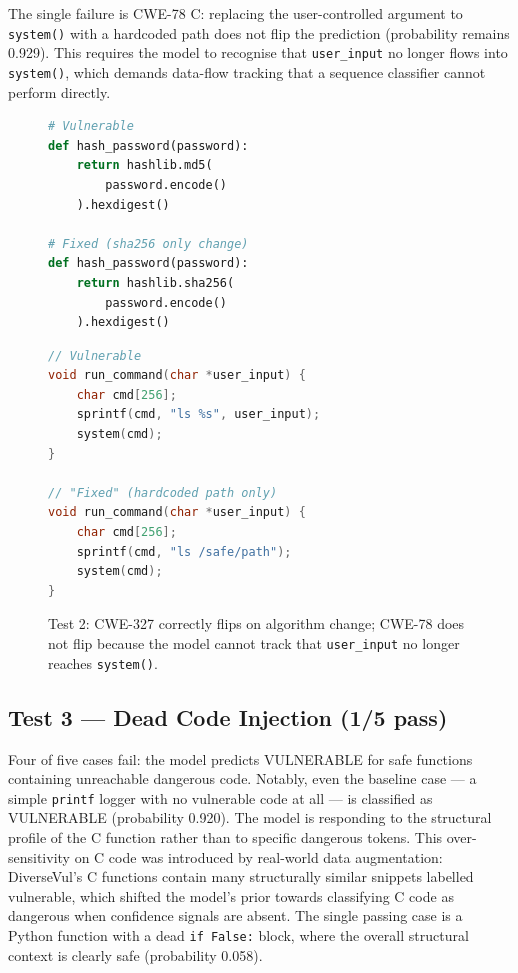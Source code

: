 The single failure is CWE-78 C: replacing the user-controlled argument to \texttt{system()}
with a hardcoded path does not flip the prediction (probability remains 0.929).
This requires the model to recognise that \texttt{user\_input} no longer flows into
\texttt{system()}, which demands data-flow tracking that a sequence classifier cannot
perform directly.

\begin{figure}[H]
\begin{minipage}[t]{0.48\textwidth}
\begin{lstlisting}[language=Python, caption={CWE-327 vulnerable (prob 0.960) $\to$ fixed (prob 0.048). PASS.}]
# Vulnerable
def hash_password(password):
    return hashlib.md5(
        password.encode()
    ).hexdigest()

# Fixed (sha256 only change)
def hash_password(password):
    return hashlib.sha256(
        password.encode()
    ).hexdigest()
\end{lstlisting}
\end{minipage}
\hfill
\begin{minipage}[t]{0.48\textwidth}
\begin{lstlisting}[language=C, caption={CWE-78 vulnerable (prob 0.959) $\to$ ``fixed'' (prob 0.929). FAIL.}]
// Vulnerable
void run_command(char *user_input) {
    char cmd[256];
    sprintf(cmd, "ls %s", user_input);
    system(cmd);
}

// "Fixed" (hardcoded path only)
void run_command(char *user_input) {
    char cmd[256];
    sprintf(cmd, "ls /safe/path");
    system(cmd);
}
\end{lstlisting}
\end{minipage}
\caption{Test 2: CWE-327 correctly flips on algorithm change; CWE-78 does not flip
because the model cannot track that \texttt{user\_input} no longer reaches
\texttt{system()}.}
\label{fig:test2_fix}
\end{figure}

\subsection{Test 3 --- Dead Code Injection (1/5 pass)}

Four of five cases fail: the model predicts VULNERABLE for safe functions containing
unreachable dangerous code.
Notably, even the baseline case --- a simple \texttt{printf} logger with no vulnerable
code at all --- is classified as VULNERABLE (probability 0.920).
The model is responding to the structural profile of the C function rather than to
specific dangerous tokens.
This over-sensitivity on C code was introduced by real-world data augmentation:
DiverseVul's C functions contain many structurally similar snippets labelled vulnerable,
which shifted the model's prior towards classifying C code as dangerous when confidence
signals are absent.
The single passing case is a Python function with a dead \texttt{if False:} block,
where the overall structural context is clearly safe (probability 0.058).

